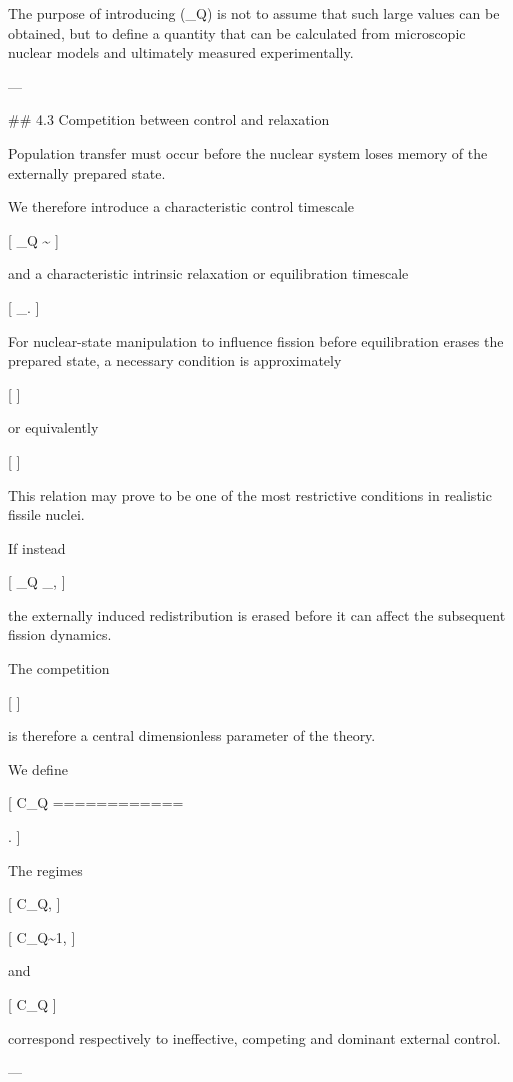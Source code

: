 The purpose of introducing (\eta_Q) is not to assume that such large values can be obtained, but to define a quantity that can be calculated from microscopic nuclear models and ultimately measured experimentally.

---

## 4.3 Competition between control and relaxation

Population transfer must occur before the nuclear system loses memory of the externally prepared state.

We therefore introduce a characteristic control timescale

[
\tau_Q
\sim
{}
]

and a characteristic intrinsic relaxation or equilibration timescale

[
\tau_{}.
]

For nuclear-state manipulation to influence fission before equilibration erases the prepared state, a necessary condition is approximately

[
]

or equivalently

[
]

This relation may prove to be one of the most restrictive conditions in realistic fissile nuclei.

If instead

[
\tau_Q
\gg
\tau_{},
]

the externally induced redistribution is erased before it can affect the subsequent fission dynamics.

The competition

[
\quad{}\quad
{}
]

is therefore a central dimensionless parameter of the theory.

We define

[
\mathcal C_Q
============

.
]

The regimes

[
\mathcal C_Q,
]

[
\mathcal C_Q\sim1,
]

and

[
\mathcal C_Q
]

correspond respectively to ineffective, competing and dominant external control.

---

